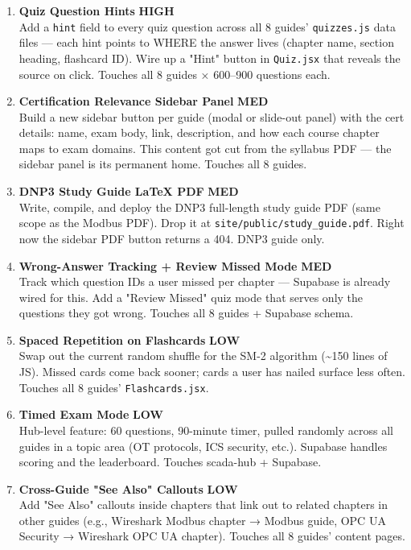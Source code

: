 \documentclass[10pt]{article}
\newcommand{\high}{\textcolor{sred}{\small\bfseries HIGH}}
\newcommand{\med}{\textcolor{samber}{\small\bfseries MED}}
\newcommand{\low}{\textcolor{sgreen}{\small\bfseries LOW}}
\begin{document}
\begin{enumerate}\small
  \item \textbf{Quiz Question Hints} \hfill \high \\
    Add a \texttt{hint} field to every quiz question across all 8 guides' \texttt{quizzes.js} data files — each hint points to WHERE the answer lives (chapter name, section heading, flashcard ID). Wire up a "Hint" button in \texttt{Quiz.jsx} that reveals the source on click. Touches all 8 guides × 600–900 questions each.

  \item \textbf{Certification Relevance Sidebar Panel} \hfill \med \\
    Build a new sidebar button per guide (modal or slide-out panel) with the cert details: name, exam body, link, description, and how each course chapter maps to exam domains. This content got cut from the syllabus PDF — the sidebar panel is its permanent home. Touches all 8 guides.

  \item \textbf{DNP3 Study Guide LaTeX PDF} \hfill \med \\
    Write, compile, and deploy the DNP3 full-length study guide PDF (same scope as the Modbus PDF). Drop it at \texttt{site/public/study\_guide.pdf}. Right now the sidebar PDF button returns a 404. DNP3 guide only.

  \item \textbf{Wrong-Answer Tracking + Review Missed Mode} \hfill \med \\
    Track which question IDs a user missed per chapter — Supabase is already wired for this. Add a "Review Missed" quiz mode that serves only the questions they got wrong. Touches all 8 guides + Supabase schema.

  \item \textbf{Spaced Repetition on Flashcards} \hfill \low \\
    Swap out the current random shuffle for the SM-2 algorithm (\textasciitilde150 lines of JS). Missed cards come back sooner; cards a user has nailed surface less often. Touches all 8 guides' \texttt{Flashcards.jsx}.

  \item \textbf{Timed Exam Mode} \hfill \low \\
    Hub-level feature: 60 questions, 90-minute timer, pulled randomly across all guides in a topic area (OT protocols, ICS security, etc.). Supabase handles scoring and the leaderboard. Touches scada-hub + Supabase.

  \item \textbf{Cross-Guide "See Also" Callouts} \hfill \low \\
    Add "See Also" callouts inside chapters that link out to related chapters in other guides (e.g., Wireshark Modbus chapter → Modbus guide, OPC UA Security → Wireshark OPC UA chapter). Touches all 8 guides' content pages.
\end{enumerate}
\end{document}
